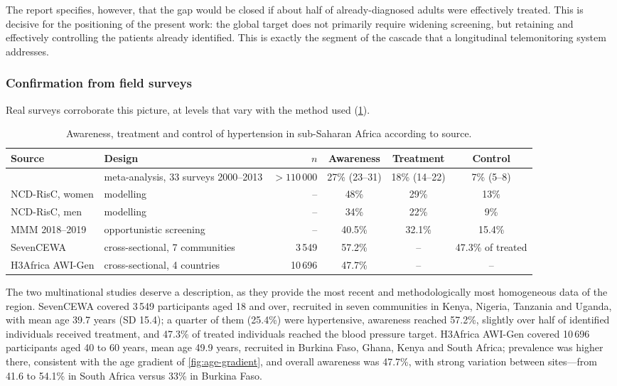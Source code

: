 \documentclass[12pt,a4paper,oneside]{report}
\begin{document}
The report specifies, however, that the gap would be closed if about half of already-diagnosed adults were effectively treated. This is decisive for the positioning of the present work: the global target does not primarily require widening screening, but retaining and effectively controlling the patients already identified. This is exactly the segment of the cascade that a longitudinal telemonitoring system addresses.

\subsubsection{Confirmation from field surveys}

Real surveys corroborate this picture, at levels that vary with the method used (\cref{tab:field}).

\begin{table}[htbp]
\centering\footnotesize
\caption{Awareness, treatment and control of hypertension in sub-Saharan Africa according to source.}\label{tab:field}
\begin{tabularx}{\textwidth}{@{}>{\raggedright\arraybackslash}p{3.3cm} >{\raggedright\arraybackslash}X r c c c@{}}
\toprule
\textbf{Source} & \textbf{Design} & \textbf{$n$} & \textbf{Awareness} & \textbf{Treatment} & \textbf{Control} \\
\midrule
\textcite{ataklte2015} & meta-analysis, 33 surveys 2000--2013 & $>110\,000$ & 27\% (23--31) & 18\% (14--22) & 7\% (5--8) \\
NCD-RisC, women & modelling & -- & 48\% & 29\% & 13\% \\
NCD-RisC, men & modelling & -- & 34\% & 22\% & 9\% \\
MMM 2018--2019 & opportunistic screening & -- & 40.5\% & 32.1\% & 15.4\% \\
SevenCEWA & cross-sectional, 7 communities & 3\,549 & 57.2\% & -- & 47.3\% of treated \\
H3Africa AWI-Gen & cross-sectional, 4 countries & 10\,696 & 47.7\% & -- & -- \\
\bottomrule
\end{tabularx}
\end{table}

The two multinational studies deserve a description, as they provide the most recent and methodologically most homogeneous data of the region. SevenCEWA covered 3\,549 participants aged 18 and over, recruited in seven communities in Kenya, Nigeria, Tanzania and Uganda, with mean age 39.7 years (SD 15.4); a quarter of them (25.4\%) were hypertensive, awareness reached 57.2\%, slightly over half of identified individuals received treatment, and 47.3\% of treated individuals reached the blood pressure target. H3Africa AWI-Gen covered 10\,696 participants aged 40 to 60 years, mean age 49.9 years, recruited in Burkina Faso, Ghana, Kenya and South Africa; prevalence was higher there, consistent with the age gradient of \cref{fig:age-gradient}, and overall awareness was 47.7\%, with strong variation between sites---from 41.6 to 54.1\% in South Africa versus 33\% in Burkina Faso.
\end{document}
